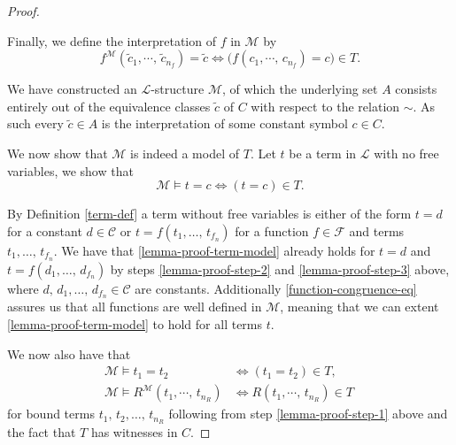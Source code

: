 \documentclass[../../main.tex]{subfiles}
\begin{document}
\begin{proof}
\begin{enumerate}
        Finally, we define the interpretation of $f$ in $\mathcal{M}$ by 
        $$f^\mathcal{M}(\tilde{c}_1,\cdots,\,\tilde{c}_{n_f}) = \tilde{c} \iff \big(f(c_1,\cdots,\,c_{n_f}) = c\big) \in T.$$
    \end{enumerate}
    We have constructed an $\mathcal{L}$-structure $\mathcal{M}$,
    of which the underlying set $A$ consists entirely out of the equivalence classes $\tilde{c}$ of $C$ with respect to the relation $\sim$.
    As such every $\tilde{c} \in A$ is the interpretation of some constant symbol $c \in C$.

    We now show that $\mathcal{M}$ is indeed a model of $T$.
    Let $t$ be a term in $\mathcal{L}$ with no free variables, 
    we show that 
    \begin{equation}\label{lemma-proof-term-model}
        \mathcal{M} \models t = c \iff (t = c) \in T.
    \end{equation}

    By Definition \ref{term-def} a term without free variables is either of the form $t = d$ for a constant $d \in \mathcal{C}$ or $t = f(t_1,\ldots,\, t_{f_n})$ for a function $f \in \mathcal{F}$ and terms $t_1,\ldots,\, t_{f_n}$.
    We have that \eqref{lemma-proof-term-model} already holds for $t = d$ and $t = f(d_1,\ldots,\, d_{f_n})$ by steps \ref{lemma-proof-step-2} and \ref{lemma-proof-step-3} above,
    where $d,\, d_1,\ldots,\, d_{f_n} \in \mathcal{C}$ are constants.
    Additionally \eqref{function-congruence-eq} assures us that all functions are well defined in $\mathcal{M}$, 
    meaning that we can extent \eqref{lemma-proof-term-model} to hold for all terms $t$.

    We now also have that
    \begin{align}
        \mathcal{M} \models t_1 = t_2  &\iff (t_1 = t_2) \in T, \label{lemma-proof-term-eqality}\\
        \mathcal{M} \models R^\mathcal{M}\left(t_1,\cdots,\,t_{n_R}\right) &\iff R(t_1,\cdots,\,t_{n_R}) \in T \ \label{lemma-proof-term-relation}
    \end{align}
    for bound terms $t_1,\, t_2, \ldots,\, t_{n_R}$ following from step \ref{lemma-proof-step-1} above and the fact that $T$ has witnesses in $C$.


\end{proof}
\end{document}
